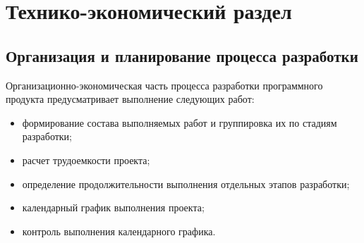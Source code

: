 \chapter{Технико-экономический раздел}
\section{Организация и планирование процесса разработки}

Организационно-экономическая часть процесса разработки программного продукта предусматривает выполнение следующих работ:
\begin{itemize}
\item формирование состава выполняемых работ и группировка их по стадиям разработки;
\item расчет трудоемкости проекта;
\item определение продолжительности выполнения отдельных этапов разработки;
\item календарный график выполнения проекта;
\item контроль выполнения календарного графика.
\end{itemize}


